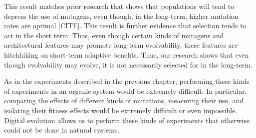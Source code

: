 \documentclass[PhD]{msu-thesis}
\begin{document}
This result matches prior research that shows that populations will tend to depress the use of mutagens, even though, in the long-term, higher mutation rates are optimal [CITE]. This result is further evidence that selection tends to act in the short term. Thus, even though certain kinds of mutagens and architectural features may promote long-term evolvability, these features are hitchhiking on short-term adaptive benefits. Thus, our research shows that even though evolvability may evolve, it is not necessarily selected for in the long-term. 


As in the experiments described in the previous chapter, performing these kinds of experiments in an organic system would be extremely difficult. In particular, comparing the effects of different kinds of mutations, measuring their use, and isolating their fitness effects would be extremely difficult or even impossible. Digital evolution allows us to perform these kinds of experiments that otherwise could not be done in natural systems. 

\end{document}

